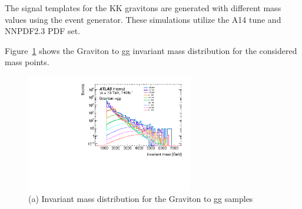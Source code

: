 The signal templates for the KK gravitons are generated with different mass values using the  event generator. These simulations utilize the A14 tune and NNPDF2.3 PDF set.

Figure~\ref{fig:Ggg} shows the Graviton to gg invariant mass distribution for the considered mass points.

\begin{figure}[!h]
	\centering
\includegraphics[width=0.65\textwidth]{fig/benchmark_signals/Ggg_mjj.pdf}
	\caption{(a) Invariant mass distribution for the Graviton to gg samples
		\label{fig:Ggg}
	}
\end{figure}

